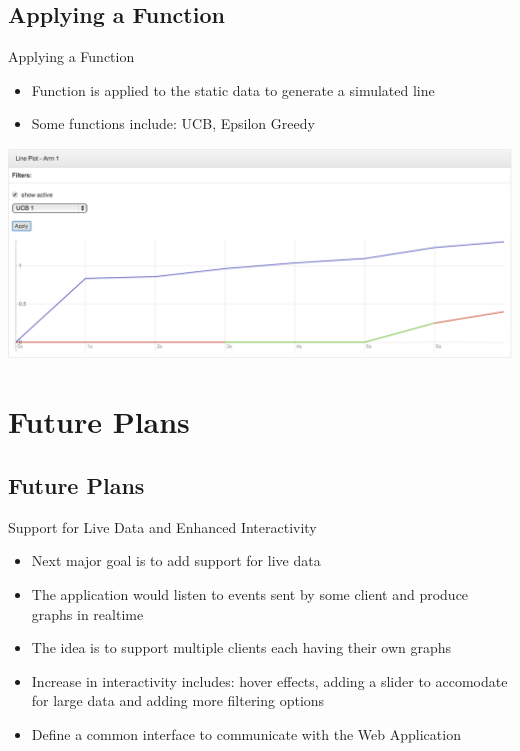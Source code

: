 \documentclass{beamer}
\begin{document}
\subsection{Applying a Function}
\begin{frame}{Applying a Function}
\begin{itemize}
\item Function is applied to the static data to generate a simulated line
\item Some functions include: UCB, Epsilon Greedy
\end{itemize}
\includegraphics[scale=0.25]{linechartfunction.png}
\end{frame}

\section{Future Plans}

\subsection{Future Plans }
\begin{frame}{Support for Live Data and Enhanced Interactivity}
\begin{itemize}
\item Next major goal is to add support for live data
\item The application would listen to events sent by some client and produce graphs in realtime
\item The idea is to support multiple clients each having their own graphs
\item Increase in interactivity includes: hover effects, adding a slider to accomodate for large data and adding more filtering options
\item Define a common interface to communicate with the Web Application
\end{itemize}
\end{frame}
\end{document}
